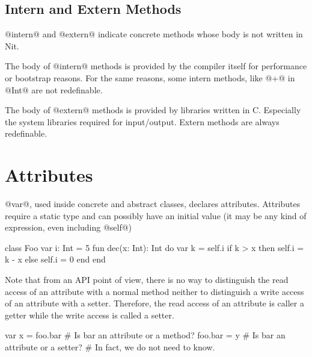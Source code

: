 \subsection{Intern and Extern Methods}\label{intern}\label{extern}

@intern@ and @extern@ indicate concrete methods whose body is not written in Nit.

The body of @intern@ methods is provided by the compiler itself for performance or bootstrap reasons.
For the same reasons, some intern methods, like @+@ in @Int@ are not redefinable.

The body of @extern@ methods is provided by libraries written in C.
Especially the system libraries required for input/output.
Extern methods are always redefinable.

\section{Attributes}\label{attribute}\label{writable}

@var@, used inside concrete and abstract classes, declares attributes.
Attributes require a static type and can possibly have an initial value (it may be any kind of expression, even including @self@)


\begin{lst}
class Foo
	var i: Int = 5
	fun dec(x: Int): Int
	do
		var k = self.i
		if k > x then self.i = k - x else self.i = 0
	end
end
\end{lst}

Note that from an API point of view, there is no way to distinguish the read access of an attribute with a normal method neither to distinguish a write access of an attribute with a setter.
Therefore, the read access of an attribute is caller a getter while the write access is called a setter.
\begin{lst}
var x = foo.bar # Is bar an attribute or a method?
foo.bar = y # Is bar an attribute or a setter?
# In fact, we do not need to know.
\end{lst}


